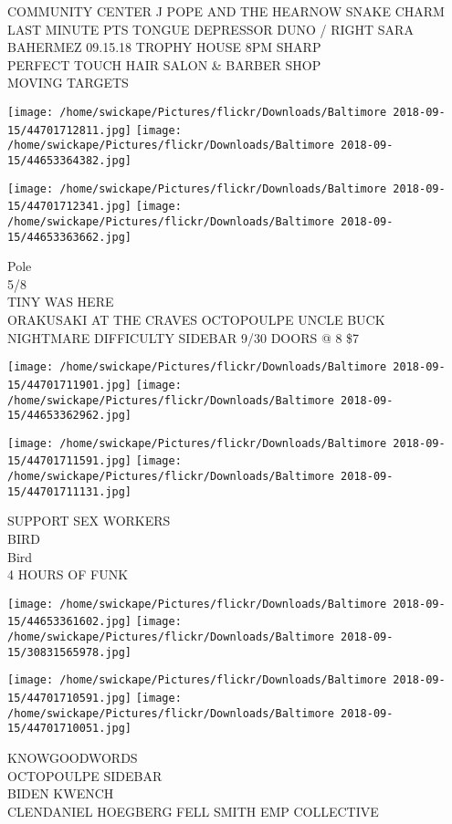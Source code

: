 \documentclass[10pt,letterpaper]{article}
\begin{document}
COMMUNITY CENTER J POPE AND THE HEARNOW SNAKE CHARM\\
LAST MINUTE PTS TONGUE DEPRESSOR DUNO / RIGHT SARA BAHERMEZ 09.15.18 TROPHY HOUSE 8PM SHARP\\
PERFECT TOUCH HAIR SALON \& BARBER SHOP\\
MOVING TARGETS
\pagebreak

\texttt{[image: /home/swickape/Pictures/flickr/Downloads/Baltimore 2018-09-15/44701712811.jpg]}
\texttt{[image: /home/swickape/Pictures/flickr/Downloads/Baltimore 2018-09-15/44653364382.jpg]}

\texttt{[image: /home/swickape/Pictures/flickr/Downloads/Baltimore 2018-09-15/44701712341.jpg]}
\texttt{[image: /home/swickape/Pictures/flickr/Downloads/Baltimore 2018-09-15/44653363662.jpg]}

Pole\\
5/8\\
TINY WAS HERE\\
ORAKUSAKI AT THE CRAVES OCTOPOULPE UNCLE BUCK NIGHTMARE DIFFICULTY SIDEBAR 9/30 DOORS @ 8 \$7
\pagebreak

\texttt{[image: /home/swickape/Pictures/flickr/Downloads/Baltimore 2018-09-15/44701711901.jpg]}
\texttt{[image: /home/swickape/Pictures/flickr/Downloads/Baltimore 2018-09-15/44653362962.jpg]}

\texttt{[image: /home/swickape/Pictures/flickr/Downloads/Baltimore 2018-09-15/44701711591.jpg]}
\texttt{[image: /home/swickape/Pictures/flickr/Downloads/Baltimore 2018-09-15/44701711131.jpg]}

SUPPORT SEX WORKERS\\
BIRD\\
Bird\\
4 HOURS OF FUNK
\pagebreak

\texttt{[image: /home/swickape/Pictures/flickr/Downloads/Baltimore 2018-09-15/44653361602.jpg]}
\texttt{[image: /home/swickape/Pictures/flickr/Downloads/Baltimore 2018-09-15/30831565978.jpg]}

\texttt{[image: /home/swickape/Pictures/flickr/Downloads/Baltimore 2018-09-15/44701710591.jpg]}
\texttt{[image: /home/swickape/Pictures/flickr/Downloads/Baltimore 2018-09-15/44701710051.jpg]}

KNOWGOODWORDS\\
OCTOPOULPE SIDEBAR\\
BIDEN KWENCH\\
CLENDANIEL HOEGBERG FELL SMITH EMP COLLECTIVE
\pagebreak
\end{document}

